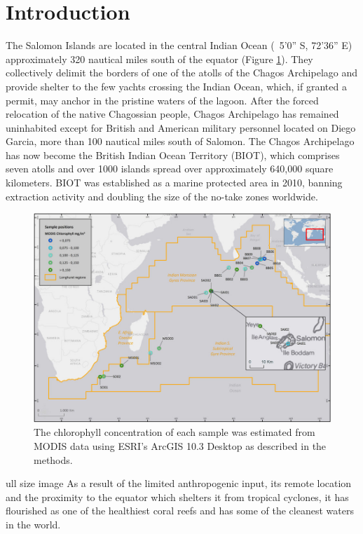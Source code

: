 \section{Introduction}

The Salomon Islands are located in the central Indian Ocean (~5'0'' S, 72'36'' E) approximately 320 nautical miles south of the equator (Figure \ref{Chagos_fig1}). They collectively delimit the borders of one of the atolls of the Chagos Archipelago and provide shelter to the few yachts crossing the Indian Ocean, which, if granted a permit, may anchor in the pristine waters of the lagoon. After the forced relocation of the native Chagossian people, Chagos Archipelago has remained uninhabited except for British and American military personnel located on Diego Garcia, more than 100 nautical miles south of Salomon. The Chagos Archipelago has now become the British Indian Ocean Territory (BIOT), which comprises seven atolls and over 1000 islands spread over approximately 640,000 square kilometers. BIOT was established as a marine protected area in 2010, banning extraction activity and doubling the size of the no-take zones worldwide.\cite{sheppard2012reefs}

\begin{figure}
    \centering
    \includegraphics[width=\textwidth]{Chagos/figures/fig1}
    \caption{The chlorophyll concentration of each sample was estimated from MODIS data using ESRI's ArcGIS 10.3 Desktop as described in the methods.}
    \label{Chagos_fig1}
\end{figure}

ull size image
As a result of the limited anthropogenic input, its remote location and the proximity to the equator which shelters it from tropical cyclones, it has flourished as one of the healthiest coral reefs and has some of the cleanest waters in the world. \cite{sheppard2012reefs, riegl_human_2012}

